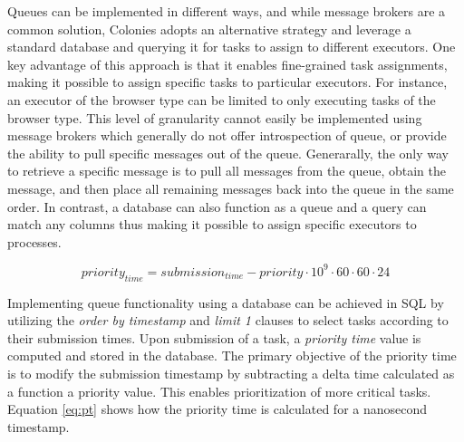 \documentclass{article}
\begin{document}
Queues can be implemented in different ways, and while message brokers are a common solution, Colonies adopts an alternative strategy and leverage a standard database and querying it for tasks to assign to different executors. One key advantage of this approach is that it enables fine-grained task assignments, making it possible to assign specific tasks to particular executors. For instance, an executor of the browser type can be limited to only executing tasks of the browser type. This level of granularity cannot easily be implemented using message brokers which generally do not offer introspection of queue, or provide the ability to pull specific messages out of the queue. Generarally, the only way to retrieve a specific message is to pull all messages from the queue, obtain the message, and then place all remaining messages back into the queue in the same order. In contrast, a database can also function as a queue and a query can match any columns thus making it possible to assign specific executors to processes.

\begin{equation}
    \label{eq:pt}
    priority_{time}=submission_{time} - priority \cdot 10^9 \cdot 60 \cdot 60 \cdot 24
\end{equation}

Implementing queue functionality using a database can be achieved in SQL by utilizing the \emph{order by timestamp} and \emph{limit 1} clauses to select tasks according to their submission times. Upon submission of a task, a \emph{priority time} value is computed and stored in the database. The primary objective of the priority time is to modify the submission timestamp by subtracting a delta time calculated as a function a priority value. This enables prioritization of more critical tasks. Equation \ref{eq:pt} shows how the priority time is calculated for a nanosecond timestamp. 
\end{document}
